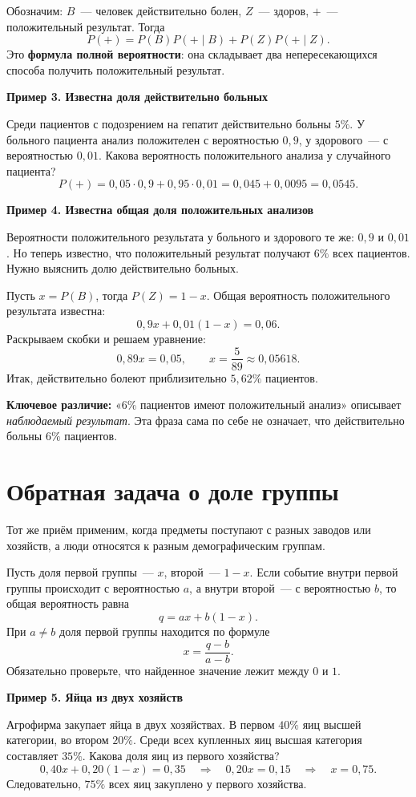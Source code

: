 \documentclass[a4paper,12pt]{article}
\newcommand{\smalltopic}[1]{\par\vspace{7pt}\noindent\textcolor{darkaccent}{\bfseries #1}\par\vspace{1pt}}
\newcommand{\important}[1]{\textcolor{darkaccent}{\bfseries #1}}
\newcommand{\ex}[1]{\needspace{9\baselineskip}\smalltopic{#1}}
\begin{document}
Обозначим: $B$~--- человек действительно болен, $Z$~--- здоров, $+$~--- положительный результат. Тогда
\[
\boxed{P(+)=P(B)P(+\mid B)+P(Z)P(+\mid Z).}
\]
Это \important{формула полной вероятности}: она складывает два непересекающихся способа получить положительный результат.

\ex{Пример 3. Известна доля действительно больных}
Среди пациентов с подозрением на гепатит действительно больны $5\%$. У больного пациента анализ положителен с вероятностью $0{,}9$, у здорового~--- с вероятностью $0{,}01$. Какова вероятность положительного анализа у случайного пациента?
\[
P(+)=0{,}05\cdot0{,}9+0{,}95\cdot0{,}01
=0{,}045+0{,}0095=\boxed{0{,}0545}.
\]

\ex{Пример 4. Известна общая доля положительных анализов}
Вероятности положительного результата у больного и здорового те же: $0{,}9$ и $0{,}01$. Но теперь известно, что положительный результат получают $6\%$ всех пациентов. Нужно выяснить долю действительно больных.

Пусть $x=P(B)$, тогда $P(Z)=1-x$. Общая вероятность положительного результата известна:
\[
0{,}9x+0{,}01(1-x)=0{,}06.
\]
Раскрываем скобки и решаем уравнение:
\[
0{,}89x=0{,}05,\qquad x=\frac{5}{89}\approx0{,}05618.
\]
Итак, действительно болеют приблизительно $5{,}62\%$ пациентов.

\important{Ключевое различие:} «$6\%$ пациентов имеют положительный анализ» описывает \emph{наблюдаемый результат}. Эта фраза сама по себе не означает, что действительно больны $6\%$ пациентов.

\section{Обратная задача о доле группы}
Тот же приём применим, когда предметы поступают с разных заводов или хозяйств, а люди относятся к разным демографическим группам.

Пусть доля первой группы~--- $x$, второй~--- $1-x$. Если событие внутри первой группы происходит с вероятностью $a$, а внутри второй~--- с вероятностью $b$, то общая вероятность равна
\[
q=ax+b(1-x).
\]
При $a\ne b$ доля первой группы находится по формуле
\[
\boxed{x=\frac{q-b}{a-b}}.
\]
Обязательно проверьте, что найденное значение лежит между $0$ и $1$.

\ex{Пример 5. Яйца из двух хозяйств}
Агрофирма закупает яйца в двух хозяйствах. В первом $40\%$ яиц высшей категории, во втором $20\%$. Среди всех купленных яиц высшая категория составляет $35\%$. Какова доля яиц из первого хозяйства?
\[
0{,}40x+0{,}20(1-x)=0{,}35
\quad\Longrightarrow\quad 0{,}20x=0{,}15
\quad\Longrightarrow\quad \boxed{x=0{,}75}.
\]
Следовательно, $75\%$ всех яиц закуплено у первого хозяйства.
\end{document}
